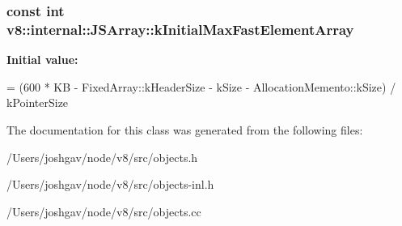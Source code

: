 \subsubsection[{\texorpdfstring{k\+Initial\+Max\+Fast\+Element\+Array}{kInitialMaxFastElementArray}}]{\setlength{\rightskip}{0pt plus 5cm}const int v8\+::internal\+::\+J\+S\+Array\+::k\+Initial\+Max\+Fast\+Element\+Array\hspace{0.3cm}{\ttfamily [static]}}\hypertarget{classv8_1_1internal_1_1_j_s_array_a42a590c6a358190389066e4b127bcf5b}{}\label{classv8_1_1internal_1_1_j_s_array_a42a590c6a358190389066e4b127bcf5b}
{\bfseries Initial value\+:}
\begin{DoxyCode}
=
      (600 * KB - FixedArray::kHeaderSize - kSize - AllocationMemento::kSize) /
      kPointerSize
\end{DoxyCode}


The documentation for this class was generated from the following files\+:\begin{DoxyCompactItemize}
\item 
/\+Users/joshgav/node/v8/src/objects.\+h\item 
/\+Users/joshgav/node/v8/src/objects-\/inl.\+h\item 
/\+Users/joshgav/node/v8/src/objects.\+cc\end{DoxyCompactItemize}
